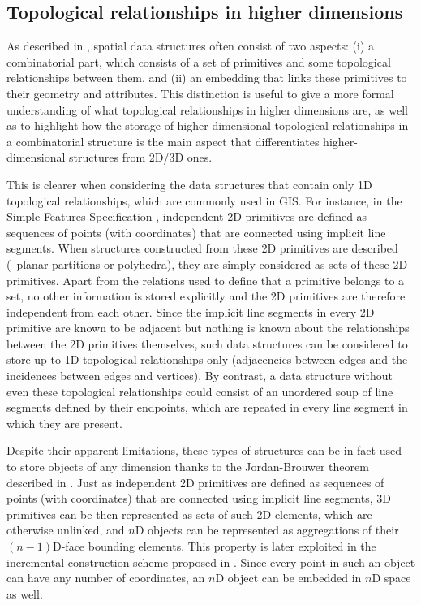 \subsection{Topological relationships in higher dimensions}
\label{ss:nd-topology}

As described in , spatial data structures often consist of two aspects: (i) a combinatorial part, which consists of a set of primitives and some topological relationships between them, and (ii) an embedding that links these primitives to their geometry and attributes.
This distinction is useful to give a more formal understanding of what topological relationships in higher dimensions are, as well as to highlight how the storage of higher-dimensional topological relationships in a combinatorial structure is the main aspect that differentiates higher-dimensional structures from 2D/3D ones.

This is clearer when considering the data structures that contain only 1D topological relationships, which are commonly used in GIS.\@
For instance, in the Simple Features Specification \citep{SimpleFeatures1}, independent 2D primitives are defined as sequences of points (with coordinates) that are connected using implicit line segments.
When structures constructed from these 2D primitives are described (\eg\ planar partitions or polyhedra), they are simply considered as sets of these 2D primitives.
Apart from the relations used to define that a primitive belongs to a set, no other information is stored explicitly and the 2D primitives are therefore independent from each other.
Since the implicit line segments in every 2D primitive are known to be adjacent but nothing is known about the relationships between the 2D primitives themselves, such data structures can be considered to store up to 1D topological relationships only (adjacencies between edges and the incidences between edges and vertices).
By contrast, a data structure without even these topological relationships could consist of an unordered soup of line segments defined by their endpoints, which are repeated in every line segment in which they are present.

Despite their apparent limitations, these types of structures can be in fact used to store objects of any dimension thanks to the Jordan-Brouwer theorem \citep{Lebesgue11,Brouwer11} described in .
Just as independent 2D primitives are defined as sequences of points (with coordinates) that are connected using implicit line segments, 3D primitives can be then represented as sets of such 2D elements, which are otherwise unlinked, and $n$D objects can be represented as aggregations of their $(n-1)$D-face bounding elements.
This property is later exploited in the incremental construction scheme proposed in .
Since every point in such an object can have any number of coordinates, an $n$D object can be embedded in $n$D space as well.

